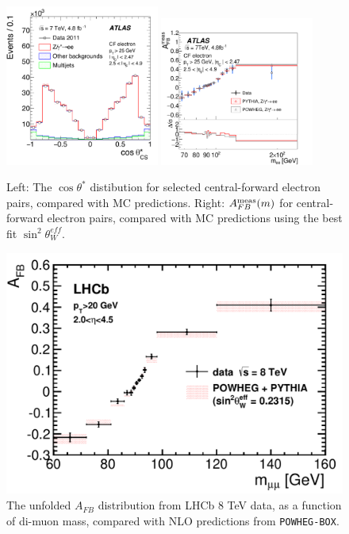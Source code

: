 \begin{figure}[p]
    \centering
    \includegraphics[width=0.45\textwidth]{figures/ss-precision-afb-atlas-cf-ct.pdf}
    \includegraphics[width=0.45\textwidth]{figures/ss-precision-afb-atlas-cf-afb.pdf}
    \caption{
    Left: The $\cos\theta^*$ distibution for selected central-forward electron pairs, compared with MC predictions.
    Right: $A^{\rm meas}_{FB}(m)$ for central-forward electron pairs, compared with MC predictions using the best fit $\sin^2\theta^{eff}_{W}$.}
    \label{fig:ss-precision-afb-atlas-cf}
\end{figure}

\begin{figure}[p]
    \centering
    \includegraphics[height=0.3\textheight]{figures/ss-precision-afb-lhcb.pdf}
    \caption{The
unfolded $A_{FB}$ distribution from LHCb 8 TeV data, as a function of di-muon mass, compared with NLO predictions from \texttt{POWHEG-BOX}.
    }
    \label{fig:ss-precision-afb-lhcb}
\end{figure}

